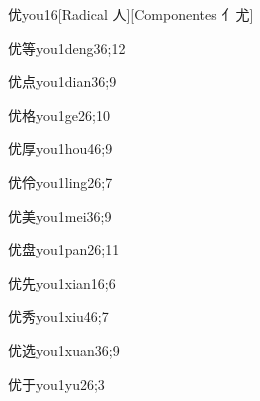 \begin{verbete}{优}{you1}{6}[Radical 人][Componentes 亻尤]
\end{verbete}

\begin{verbete}{优等}{you1deng3}{6;12}
\end{verbete}

\begin{verbete}{优点}{you1dian3}{6;9}
\end{verbete}

\begin{verbete}{优格}{you1ge2}{6;10}
\end{verbete}

\begin{verbete}{优厚}{you1hou4}{6;9}
\end{verbete}

\begin{verbete}{优伶}{you1ling2}{6;7}
\end{verbete}

\begin{verbete}{优美}{you1mei3}{6;9}
\end{verbete}

\begin{verbete}{优盘}{you1pan2}{6;11}
\end{verbete}

\begin{verbete}{优先}{you1xian1}{6;6}
\end{verbete}

\begin{verbete}{优秀}{you1xiu4}{6;7}
\end{verbete}

\begin{verbete}{优选}{you1xuan3}{6;9}
\end{verbete}

\begin{verbete}{优于}{you1yu2}{6;3}
\end{verbete}

